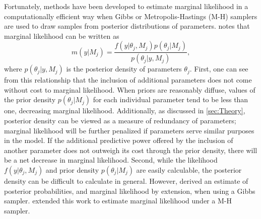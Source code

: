 \documentclass[twocolumn]{article}
\begin{document}
Fortunately, methods have been developed to estimate marginal likelihood in a computationally efficient way when Gibbs or Metropolis-Hastings (M-H) samplers are used to draw samples from posterior distributions of parameters. \cite{Chib} notes that marginal likelihood can be written as 
\begin{equation}
	\label{eq:MLChib}
	m(y|M_j) = \frac{f(y|\theta_j, M_j)p(\theta_j|M_j)}{p(\theta_j|y, M_j)},
\end{equation}
where $p(\theta_j|y, M_j)$ is the posterior density of parameters $\theta_j$. First, one can see from this relationship that the inclusion of additional parameters does not come without cost to marginal likelihood. When priors are reasonably diffuse, values of the prior density $p(\theta_j|M_j)$ for each individual parameter tend to be less than one, decreasing marginal likelihood. Additionally, as discussed in \cref{sec:Theory}, posterior density can be viewed as a measure of redundancy of parameters; marginal likelihood will be further penalized if parameters serve similar purposes in the model. If the additional predictive power offered by the inclusion of another parameter does not outweigh its cost through the prior density, there will be a net decrease in marginal likelihood. Second, while the likelihood $f(y|\theta_j, M_j)$ and prior density $p(\theta_j|M_j)$ are easily calculable, the posterior density can be difficult to calculate in general. However, \cite{Chib} derived an estimate of posterior probabilities, and marginal likelihood by extension, when using a Gibbs sampler. \cite{ChibJeliazkov} extended this work to estimate marginal likelihood under a M-H sampler.
\end{document}
